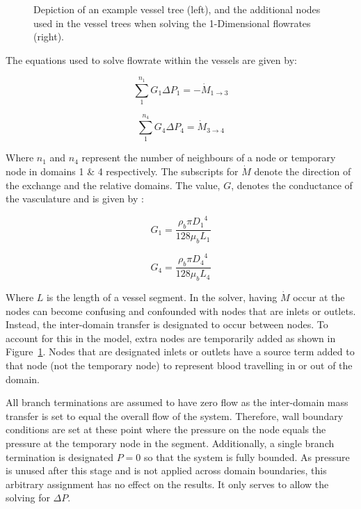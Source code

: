 \documentclass[11pt,english,a4paper,twoside,openright]{report}
\begin{document}
{{{{{{{{\begin{figure}[h]
\begin{subfigure}[b]{0.35\textwidth}
	\end{subfigure}
	\caption[Depiction of additional nodes used in the vessel trees when solving the 1-Dimensional flowrates]{Depiction of an example vessel tree (left), and the additional nodes used in the vessel trees when solving the 1-Dimensional flowrates (right).}
	\label{fig:VesselNodes}
\end{figure}

The equations used to solve flowrate within the vessels are given by:

\begin{equation}
\label{Eq:1DFlowrate}
\sum_1^{n_{1}} G_{1}\Delta P_{1} = -\dot{M}_{1\rightarrow3}
\end{equation}

\begin{equation}
\label{Eq:1DFlowrate2}
\sum_1^{n_{4}} G_{4}\Delta P_{4} = \dot{M}_{3\rightarrow4}
\end{equation}

Where $n_{1}$ and $n_{4}$ represent the number of neighbours of a node or temporary node in domains 1 \& 4 respectively. The subscripts for $\dot{M}$ denote the direction of the exchange and the relative domains. The value, $G$, denotes the conductance of the vasculature and is given by \cite{reichold2009vascular}:

\begin{equation}
\label{Eq:1DConductance}
G_{1} = \frac{\rho_{b}\pi {D_{1}}^{4}}{128\mu_{b}L_{1}}
\end{equation}

\begin{equation}
\label{Eq:1DConductance2}
G_{4} = \frac{\rho_{b}\pi {D_{4}}^{4}}{128\mu_{b}L_{4}}
\end{equation}

Where $L$ is the length of a vessel segment. In the solver, having $\dot{M}$ occur at the nodes can become confusing and confounded with nodes that are inlets or outlets. Instead, the inter-domain transfer is designated to occur between nodes. To account for this in the model, extra nodes are temporarily added as shown in Figure~\ref{fig:VesselNodes}. Nodes that are designated inlets or outlets have a source term added to that node (not the temporary node) to represent blood travelling in or out of the domain.

All branch terminations are assumed to have zero flow as the inter-domain mass transfer is set to equal the overall flow of the system. Therefore, wall boundary conditions are set at these point where the pressure on the node equals the pressure at the temporary node in the segment. Additionally, a single branch termination is designated $P=0$ so that the system is fully bounded. As pressure is unused after this stage and is not applied across domain boundaries, this arbitrary assignment has no effect on the results. It only serves to allow the solving for $\Delta P$.

}}}}}}}}
\end{document}
